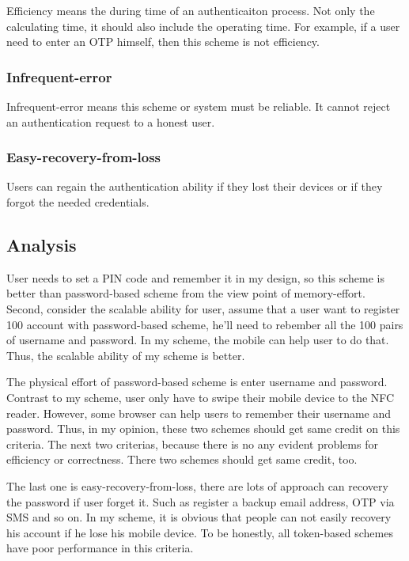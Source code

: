 \begin{CJK}{Bg5}{bsmi}
Efficiency means the during time of an authenticaiton process. Not only the calculating time, it should also include the operating time. For example, if a user need to enter an OTP himself, then this scheme is not efficiency.

\subsubsection{Infrequent-error}

Infrequent-error means this scheme or system must be reliable. It cannot reject an authentication request to a honest user.

\subsubsection{Easy-recovery-from-loss}

Users can regain the authentication ability if they lost their devices or if they forgot the needed credentials.

\subsection{Analysis}

User needs to set a PIN code and remember it in my design, so this scheme is better than password-based scheme from the view point of memory-effort. Second, consider the scalable ability for user, assume that a user want to register 100 account with password-based scheme, he'll need to rebember all the 100 pairs of username and password. In my scheme, the mobile can help user to do that. Thus, the scalable ability of my scheme is better.

The physical effort of password-based scheme is enter username and password. Contrast to my scheme, user only have to swipe their mobile device to the NFC reader. However, some browser can help users to remember their username and password. Thus, in my opinion, these two schemes should get same credit on this criteria. The next two criterias, because there is no any evident problems for efficiency or correctness. There two schemes should get same credit, too.

The last one is easy-recovery-from-loss, there are lots of approach can recovery the password if user forget it. Such as register a backup email address, OTP via SMS and so on. In my scheme, it is obvious that people can not easily recovery his account if he lose his mobile device. To be honestly, all token-based schemes have poor performance in this criteria.


\end{CJK}
